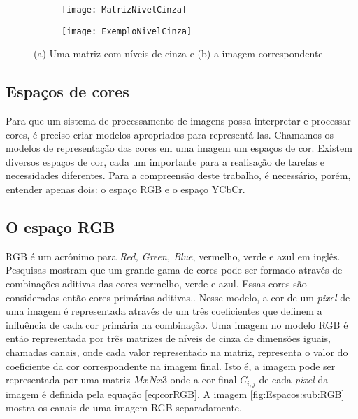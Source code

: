 \begin{figure}
 \centering
\begin{subfigure}{.5\textwidth}
  \centering
  \texttt{[image: MatrizNivelCinza]}
  \caption{}
  \label{exemplo:sfig1}
\end{subfigure}%
\begin{subfigure}{.5\textwidth}
  \centering
  \texttt{[image: ExemploNivelCinza]}
  \caption{}
  \label{exemplo:sfig2}
\end{subfigure}
\caption{(a) Uma matriz com níveis de cinza e (b) a imagem correspondente}
\label{fig:NivelCinza}
\end{figure}


\subsection{Espaços de cores}

Para que um sistema de processamento de imagens possa interpretar e processar cores, é preciso criar modelos apropriados para representá-las. Chamamos os modelos de representação das cores em uma imagem um espaços de cor. Existem diversos espaços de cor, cada um importante para a realisação de tarefas e necessidades diferentes. Para a compreensão deste trabalho, é necessário, porém, entender apenas dois: o espaço RGB e o espaço YCbCr.

\subsection{O espaço RGB}


RGB é um acrônimo para \textit{Red, Green, Blue}, vermelho, verde e azul em inglês. Pesquisas mostram que um grande gama de cores pode ser formado através de combinações aditivas das cores vermelho, verde e azul. Essas cores são consideradas então cores primárias aditivas.\cite{IBGE2000introducao}. Nesse modelo, a cor de um \textit{pixel} de uma imagem é representada através de um três coeficientes que definem a influência de cada cor primária na combinação. Uma imagem no modelo RGB é então representada por três matrizes de níveis de cinza de dimensões iguais, chamadas canais, onde cada valor representado na matriz, representa o valor do coeficiente da cor correspondente na imagem final. Isto é, a imagem pode ser representada por uma matriz $MxNx3$ onde a cor final $C_{i,j}$ de cada \textit{pixel} da imagem é definida pela equação \ref{eq:corRGB}. A imagem \ref{fig:Espacos:sub:RGB} mostra os canais de uma imagem RGB separadamente.

